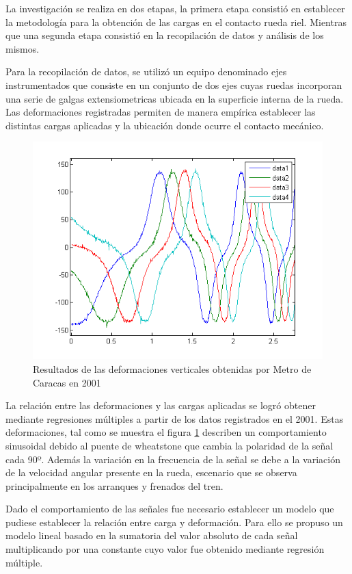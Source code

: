 \documentclass[main]{subfiles}
\begin{document}
La investigación se realiza en dos etapas, la primera etapa consistió en establecer la metodología para la obtención de las cargas en el contacto rueda riel. Mientras que una segunda etapa consistió en la recopilación de datos y análisis de los mismos.

Para la recopilación de datos, se utilizó un equipo denominado ejes instrumentados que consiste en un conjunto de dos ejes cuyas ruedas incorporan una serie de galgas extensiometricas ubicada en la superficie interna de la rueda. Las deformaciones registradas permiten de manera empírica establecer las distintas cargas aplicadas y la ubicación donde ocurre el contacto mecánico.


\begin{figure}[!htbp]
\centering
\includegraphics[scale=0.7]{DataGraf.png}
  \caption{Resultados de las deformaciones verticales obtenidas por Metro de Caracas en 2001}
  \label{fig:DataGraf}
\end{figure}  

La relación entre las deformaciones y las cargas aplicadas se logró obtener mediante regresiones múltiples a partir de los datos registrados en el 2001. Estas deformaciones, tal como se muestra el figura \ref{fig:DataGraf} describen un comportamiento sinusoidal debido al puente de wheatstone que cambia la polaridad de la señal cada 90º. Además la variación en la frecuencia de la señal se debe a la variación de la velocidad angular presente en la rueda, escenario que se observa principalmente en los arranques y frenados del tren.

Dado el comportamiento de las señales fue necesario establecer un modelo que pudiese establecer la relación entre carga y deformación. Para ello se propuso un modelo lineal basado en la sumatoria del valor absoluto de cada señal multiplicando por una constante cuyo valor fue obtenido mediante regresión múltiple.
\end{document}
